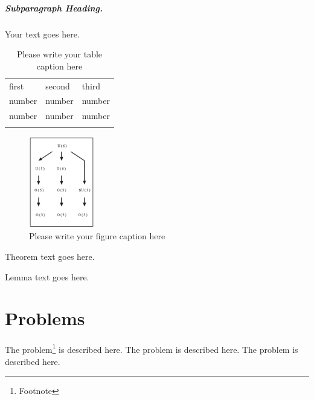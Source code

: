 \subparagraph{Subparagraph Heading.} Your text goes here.%
%
%
%
\begin{table}
	\centering
	\caption{Please write your table caption here}
	\label{tab:1}       %
	\begin{tabular}{lll}
		\hline\noalign{\smallskip}
		first & second & third  \\
		\noalign{\smallskip}\hline\noalign{\smallskip}
		number & number & number \\
		number & number & number \\
		\noalign{\smallskip}\hline
	\end{tabular}
\end{table}
%
%
%
\begin{figure}
	\centering
	\includegraphics[height=4cm]{figure}
	\caption{Please write your figure caption here}
	\label{fig:1}       %
\end{figure}
%
%
\begin{theorem}
	Theorem text goes here.
\end{theorem}
%
%
\begin{lemma}
	Lemma text goes here.
\end{lemma}
%
%
\section*{Problems}
%
\begin{prob}
	\label{prob1}
	The problem\footnote{Footnote} is described here. The
	problem is described here. The problem is described here.
\end{prob}

